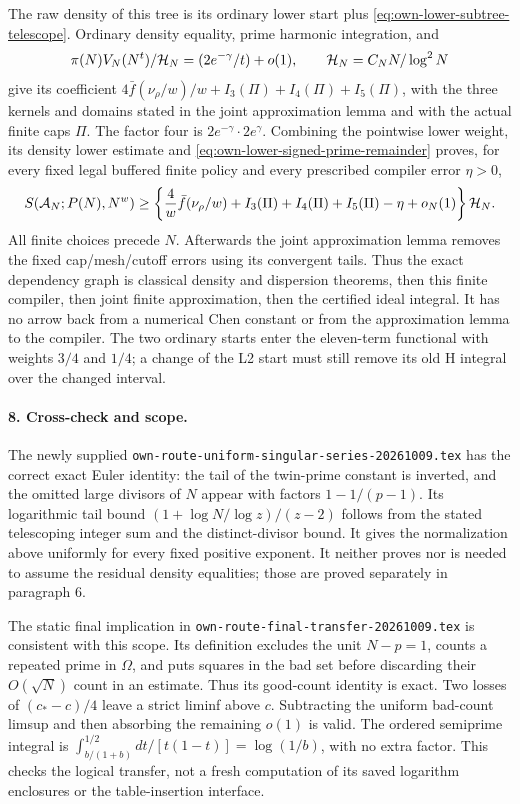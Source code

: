The raw density of this tree is its ordinary lower start plus
\eqref{eq:own-lower-subtree-telescope}. Ordinary density equality,
prime harmonic integration, and
\[
 \pi(N)V_N(N^t)/{\cal H}_N=(2e^{-\gamma}/t)+o(1),\qquad
 {\cal H}_N=C_NN/\log^2N
\]
give its coefficient \(4\bar f(\nu_\rho/w)/w+I_3(\Pi)+I_4(\Pi)+I_5(\Pi)\),
with the three kernels and domains stated in the joint approximation
lemma and with the actual finite caps \(\Pi\).
The factor four is \(2e^{-\gamma}\cdot2e^\gamma\).
Combining the pointwise lower weight, its density lower estimate and
\eqref{eq:own-lower-signed-prime-remainder} proves, for every fixed
legal buffered finite policy and every prescribed compiler error
\(\eta>0\),
\[
 S({\cal A}_N;P(N),N^w)\ge
 \left\{\frac4w\bar f(\nu_\rho/w)+I_3(\Pi)+I_4(\Pi)+I_5(\Pi)
                 -\eta+o_N(1)\right\}{\cal H}_N.
\]
All finite choices precede \(N\). Afterwards the joint approximation
lemma removes the fixed cap/mesh/cutoff errors using its convergent
tails. Thus the exact dependency graph is classical density and
dispersion theorems, then this finite compiler, then joint finite
approximation, then the certified ideal integral. It has no arrow
back from a numerical Chen constant or from the approximation lemma
to the compiler. The two ordinary starts enter the eleven-term
functional with weights \(3/4\) and \(1/4\); a change of the L2 start
must still remove its old H integral over the changed interval.

\paragraph{8. Cross-check and scope.}
The newly supplied \texttt{own-route-uniform-singular-series-20261009.tex}
has the correct exact Euler identity: the tail of the twin-prime
constant is inverted, and the omitted large divisors of \(N\) appear
with factors \(1-1/(p-1)\). Its logarithmic tail bound
\((1+\log N/\log z)/(z-2)\) follows from the stated telescoping
integer sum and the distinct-divisor bound. It gives the normalization
above uniformly for every fixed positive exponent. It neither proves
nor is needed to assume the residual density equalities; those are
proved separately in paragraph 6.

The static final implication in
\texttt{own-route-final-transfer-20261009.tex} is consistent with this
scope. Its definition excludes the unit \(N-p=1\), counts a repeated
prime in \(\Omega\), and puts squares in the bad set before discarding
their \(O(\sqrt N)\) count in an estimate. Thus its good-count identity
is exact. Two losses of \((c_*-c)/4\) leave a strict liminf above \(c\).
Subtracting the uniform bad-count limsup and then absorbing the
remaining \(o(1)\) is valid. The ordered semiprime integral is
\(\int_{b/(1+b)}^{1/2}dt/[t(1-t)]=\log(1/b)\), with no extra factor.
This checks the logical transfer, not a fresh computation of its
saved logarithm enclosures or the table-insertion interface.

